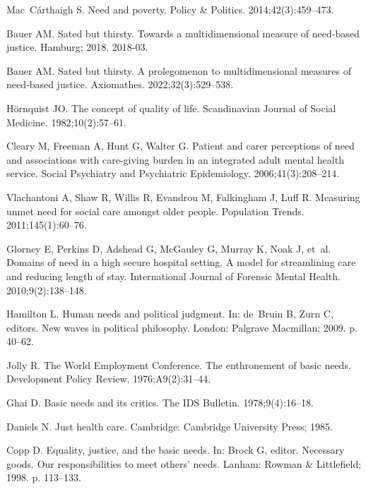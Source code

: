 \documentclass[10pt,letterpaper]{article}
\begin{document}
\begin{thebibliography}{100}
Mac~Cárthaigh S.
\newblock Need and poverty.
\newblock Policy \& Politics. 2014;42(3):459--473.

Bauer AM.
\newblock Sated but thirsty. {Towards} a multidimensional measure of need-based
  justice.
\newblock Hamburg; 2018. 2018-03.

Bauer AM.
\newblock Sated but thirsty. {A} prolegomenon to multidimensional measures of
  need‐based justice.
\newblock Axiomathes. 2022;32(3):529--538.

Hörnquist JO.
\newblock The concept of quality of life.
\newblock Scandinavian Journal of Social Medicine. 1982;10(2):57--61.

Cleary M, Freeman A, Hunt G, Walter G.
\newblock Patient and carer perceptions of need and associations with
  care-giving burden in an integrated adult mental health service.
\newblock Social Psychiatry and Psychiatric Epidemiology. 2006;41(3):208--214.

Vlachantoni A, Shaw R, Willis R, Evandrou M, Falkingham J, Luff R.
\newblock Measuring unmet need for social care amongst older people.
\newblock Population Trends. 2011;145(1):60--76.

Glorney E, Perkins D, Adshead G, McGauley G, Murray K, Noak J, et~al.
\newblock Domains of need in a high secure hospital setting. {A} model for
  streamlining care and reducing length of stay.
\newblock International Journal of Forensic Mental Health. 2010;9(2):138--148.

Hamilton L.
\newblock Human needs and political judgment.
\newblock In: de~Bruin B, Zurn C, editors. New waves in political philosophy.
  London: Palgrave Macmillan; 2009. p. 40--62.

Jolly R.
\newblock The {World} {Employment} {Conference}. {The} enthronement of basic
  needs.
\newblock Development Policy Review. 1976;A9(2):31--44.

Ghai D.
\newblock Basic needs and its critics.
\newblock The IDS Bulletin. 1978;9(4):16--18.

Daniels N.
\newblock Just health care.
\newblock Cambridge: Cambridge University Press; 1985.

Copp D.
\newblock Equality, justice, and the basic needs.
\newblock In: Brock G, editor. Necessary goods. {Our} responsibilities to meet
  others' needs. Lanham: Rowman \& Littlefield; 1998. p. 113--133.


\end{thebibliography}
\end{document}
